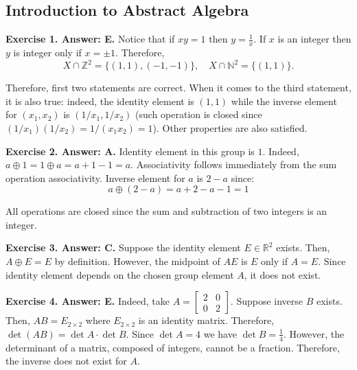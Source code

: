 \documentclass[../../book]{subfiles}
\begin{document}
\subsection*{Introduction to Abstract Algebra}

\textbf{Exercise 1. Answer: E.} Notice that if $xy=1$ then $y=\frac{1}{x}$. If 
$x$ is an integer then $y$ is integer only if $x=\pm 1$. Therefore,
\begin{equation*}
    X \cap \mathbb{Z}^2 = \{(1,1),(-1,-1)\}, \quad X \cap \mathbb{N}^2 = \{(1,1)\}.
\end{equation*}

Therefore, first two statements are correct. When it comes to the third
statement, it is also true: indeed, the identity element is $(1,1)$ while the
inverse element for $(x_1,x_2)$ is $(1/x_1,1/x_2)$ (such operation is closed since
$(1/x_1)(1/x_2) = 1/(x_1x_2) = 1$). Other properties are also satisfied.

\textbf{Exercise 2. Answer: A.} Identity element in this group is $1$. Indeed,
$a \oplus 1 = 1 \oplus a = a+1-1 = a$. Associativity follows immediately from 
the sum operation associativity. Inverse element for $a$ is $2-a$ since:
\begin{equation*}
    a \oplus (2-a) = a + 2 - a - 1 = 1
\end{equation*}

All operations are closed since the sum and subtraction of two integers is an
integer.

\textbf{Exercise 3. Answer: C.} Suppose the identity element $E \in
\mathbb{R}^2$ exists. Then, $A\oplus E = E$ by definition. However, the 
midpoint of $AE$ is $E$ only if $A=E$. Since identity element depends 
on the chosen group element $A$, it does not exist.

\textbf{Exercise 4. Answer: E.} Indeed, take $A = \begin{bmatrix}
    2 & 0 \\ 0 & 2
\end{bmatrix}$. Suppose inverse $B$ exists. Then, $AB=E_{2 \times 2}$ where 
$E_{2 \times 2}$ is an identity matrix. Therefore, $\det(AB) = \det A \cdot \det B$.
Since $\det A = 4$ we have $\det B = \frac{1}{4}$. However, the determinant 
of a matrix, composed of integers, cannot be a fraction. Therefore, the inverse
does not exist for $A$.
\end{document}
